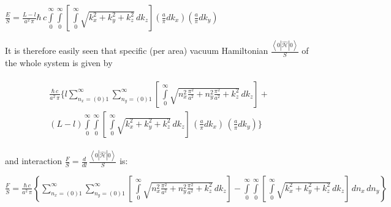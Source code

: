 \documentclass[twoside, 10pt]{article}
\begin{document}
\begin{multicols}{2}
\noindent
\(\frac{E}{S} = \frac{L-l}{a^2\,\pi}\hbar\,c\int\limits_{0}^{\infty}\int\limits_{0}^{\infty}\left[\,\int\limits_{0}^{\infty}\sqrt{k_x^2+k_y^2+k_z^2}\,dk_z\right] \left(\frac{a}{\pi}dk_x\right) \left(\frac{a}{\pi}dk_y\right)\)

    It is therefore easily seen that specific (per area) vacuum Hamiltonian
\(\frac{\left<0|\hat{\mathcal{H}}|0\right>}{S}\) of the whole system is
given by

\[\begin{array}{lr}
\begin{array}{c}\frac{\hbar\,c}{a^2\,\pi}\Bigg\{l\sum\limits_{n_x=(0)1}^{\infty}\sum\limits_{n_y=(0)1}^{\infty}\left[\,\int\limits_{0}^{\infty}\sqrt{n_x^2\frac{\pi^2}{a^2}+n_y^2\frac{\pi^2}{a^2}+k_z^2}\,dk_z\right] + \\
(L-l)\int\limits_{0}^{\infty}\int\limits_{0}^{\infty}\left[\,\int\limits_{0}^{\infty}\sqrt{k_x^2+k_y^2+k_z^2}\,dk_z\right]\,\left(\frac{a}{\pi}dk_x\right)\,\left(\frac{a}{\pi}dk_y\right)\Bigg\}
\end{array}\end{array}\]

and interaction
\(\frac{F}{S} = \frac{d}{dl} \,\frac{\left<0|\hat{\mathcal{H}}|0\right>}{S}\)
is:

\end{multicols}



\(\frac{F}{S} = \frac{\hbar\,c}{a^2\,\pi}\left\{\sum\limits_{n_x=(0)1}^{\infty}\sum\limits_{n_y=(0)1}^{\infty}\left[\,\int\limits_{0}^{\infty}\sqrt{n_x^2\frac{\pi^2}{a^2}+n_y^2\frac{\pi^2}{a^2}+k_z^2}\,dk_z\right] -
\int\limits_{0}^{\infty}\int\limits_{0}^{\infty}\left[\,\int\limits_{0}^{\infty}\sqrt{k_x^2+k_y^2+k_z^2}\,dk_z\right]\,dn_x\,dn_y\right\}\)
\end{document}
